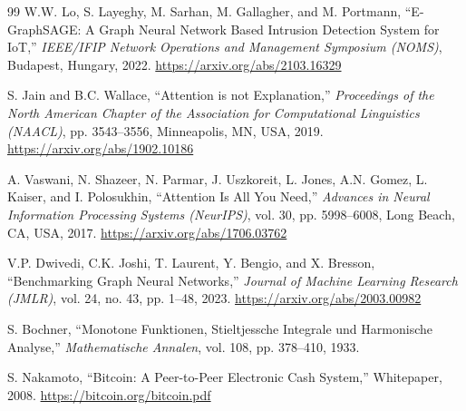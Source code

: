 \begin{thebibliography}{99}
W.W. Lo, S. Layeghy, M. Sarhan, M. Gallagher, and M. Portmann,
``E-GraphSAGE: A Graph Neural Network Based Intrusion Detection System for IoT,''
\emph{IEEE/IFIP Network Operations and Management Symposium (NOMS)},
Budapest, Hungary, 2022.
\url{https://arxiv.org/abs/2103.16329}

S. Jain and B.C. Wallace,
``Attention is not Explanation,''
\emph{Proceedings of the North American Chapter of the Association for Computational Linguistics (NAACL)},
pp. 3543--3556, Minneapolis, MN, USA, 2019.
\url{https://arxiv.org/abs/1902.10186}


A. Vaswani, N. Shazeer, N. Parmar, J. Uszkoreit, L. Jones, A.N. Gomez, L. Kaiser, and I. Polosukhin,
``Attention Is All You Need,''
\emph{Advances in Neural Information Processing Systems (NeurIPS)},
vol. 30, pp. 5998--6008, Long Beach, CA, USA, 2017.
\url{https://arxiv.org/abs/1706.03762}


V.P. Dwivedi, C.K. Joshi, T. Laurent, Y. Bengio, and X. Bresson,
``Benchmarking Graph Neural Networks,''
\emph{Journal of Machine Learning Research (JMLR)},
vol. 24, no. 43, pp. 1--48, 2023.
\url{https://arxiv.org/abs/2003.00982}


S. Bochner,
``Monotone Funktionen, Stieltjessche Integrale und Harmonische Analyse,''
\emph{Mathematische Annalen},
vol. 108, pp. 378--410, 1933.


S. Nakamoto,
``Bitcoin: A Peer-to-Peer Electronic Cash System,''
Whitepaper, 2008.
\url{https://bitcoin.org/bitcoin.pdf}



\end{thebibliography}
